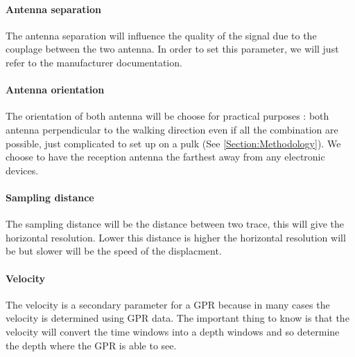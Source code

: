 \paragraph{Antenna separation} The antenna separation will influence the quality of the signal due to the couplage between the two antenna. In order to set this parameter, we will just refer to the manufacturer documentation.

\paragraph{Antenna orientation} The orientation of both antenna will be choose for practical purposes : both antenna perpendicular to the walking direction even if all the combination are possible, just complicated to set up on a pulk (See \ref{Section:Methodology}). We choose to have the reception antenna the farthest away from any electronic devices.


\paragraph{Sampling distance} The sampling distance will be the distance between two trace, this will give the horizontal resolution. Lower this distance is higher the horizontal resolution will be but slower will be the speed of the displacment.

\paragraph{Velocity} The velocity is a secondary parameter for a GPR because in many cases the velocity is determined using GPR data. The important thing to know is that the velocity will convert the time windows into a depth windows and so determine the depth where the GPR is able to see.


